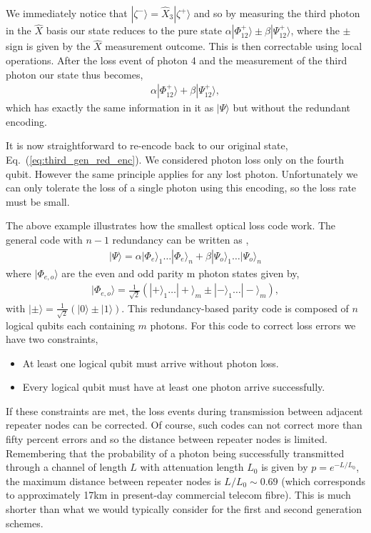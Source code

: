 We immediately notice that \mbox{$|\zeta^-\rangle=\hat{X}_3 |\zeta^+\rangle$} and so by measuring the third photon in the $\hat{X}$ basis our state reduces to the pure state \mbox{$\alpha |\Phi_{12}^+\rangle \pm \beta |\Psi_{12}^+\rangle$}, where the $\pm$ sign is given by the $\hat{X}$ measurement outcome. This is then correctable using local operations. After the loss event of photon 4 and the measurement of the third photon our state thus becomes,
\begin{align}
\alpha |\Phi_{12}^+\rangle + \beta  |\Psi_{12}^+\rangle,
\end{align}
which has exactly the same information in it as $|\Psi\rangle$ but without the redundant encoding.

It is now straightforward to re-encode back to our original state, Eq.~(\ref{eq:third_gen_red_enc}). We considered photon loss only on the fourth qubit. However the same principle applies for any lost photon. Unfortunately we can only tolerate the loss of a single photon using this encoding, so the loss rate must be small.

The above example illustrates how the smallest optical loss code work. The general code with \mbox{$n - 1$} redundancy can be written as \cite{bib:ralph05, bib:munro12},
\begin{align}
|\Psi\rangle = \alpha |\Phi_{e}\rangle_1 \ldots  |\Phi_{{e}}\rangle_n+\beta |\Psi_{o}\rangle_1 \ldots  |\Psi_{o}\rangle_n
\end{align}
where $|\Phi_{e,o}\rangle$ are the even and odd parity m photon states given by,
\begin{align}
|\Phi_{e,o}\rangle = \frac{1}{\sqrt{2}}(|+\rangle_1 \ldots  |+\rangle_m\pm |-\rangle_1 \ldots  |-\rangle_m),
\end{align}
with \mbox{$|\pm\rangle=\frac{1}{\sqrt{2}}(|0\rangle\pm |1\rangle)$}. This redundancy-based parity code is composed of $n$ logical qubits each containing $m$ photons. For this code to correct loss errors we have two constraints,
\begin{itemize}
\item At least one logical qubit must arrive without photon loss.
\item Every logical qubit must have at least one photon arrive successfully.
\end{itemize}
If these constraints are met, the loss events during transmission between adjacent repeater nodes can be corrected. Of course, such codes can not correct more than fifty percent errors and so the distance between repeater nodes is limited. Remembering that the probability of a photon being successfully transmitted through a channel of length $L$ with attenuation length $L_0$ is given by \mbox{$p=e^{-L/L_0}$}, the maximum distance between repeater nodes is \mbox{$L/L_0\sim 0.69$} (which corresponds to approximately 17km in present-day commercial telecom fibre). This is much shorter than what we would typically consider for the first and second generation schemes.

